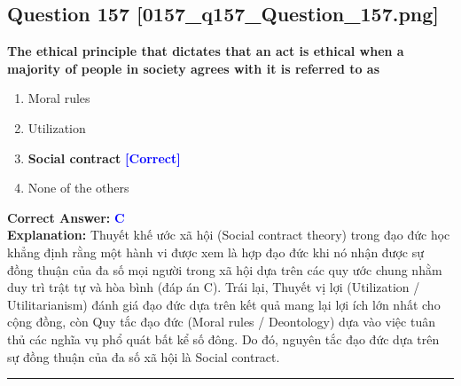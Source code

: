 \documentclass[11pt,a4paper]{article}
\begin{document}
\begin{minipage}{\textwidth}
\subsection*{Question 157 \quad \footnotesize{[0157\_q157\_Question\_157.png]}}
\noindent \textbf{The ethical principle that dictates that an act is ethical when a majority of people in society agrees with it is referred to as}

\begin{enumerate}[label=\Alph*.]
    \item Moral rules
    \item Utilization
    \item \textbf{Social contract} \hfill \textcolor{blue}{\textbf{[Correct]}}
    \item None of the others
\end{enumerate}

\noindent \textbf{Correct Answer:} \textcolor{blue}{\textbf{C}} \\[2pt]
\noindent \textbf{Explanation:} Thuyết khế ước xã hội (Social contract theory) trong đạo đức học khẳng định rằng một hành vi được xem là hợp đạo đức khi nó nhận được sự đồng thuận của đa số mọi người trong xã hội dựa trên các quy ước chung nhằm duy trì trật tự và hòa bình (đáp án C). Trái lại, Thuyết vị lợi (Utilization / Utilitarianism) đánh giá đạo đức dựa trên kết quả mang lại lợi ích lớn nhất cho cộng đồng, còn Quy tắc đạo đức (Moral rules / Deontology) dựa vào việc tuân thủ các nghĩa vụ phổ quát bất kể số đông. Do đó, nguyên tắc đạo đức dựa trên sự đồng thuận của đa số xã hội là Social contract.

\par\vspace{0.3cm}
\hrule
\vspace{0.3cm}
\end{minipage}
\end{document}
